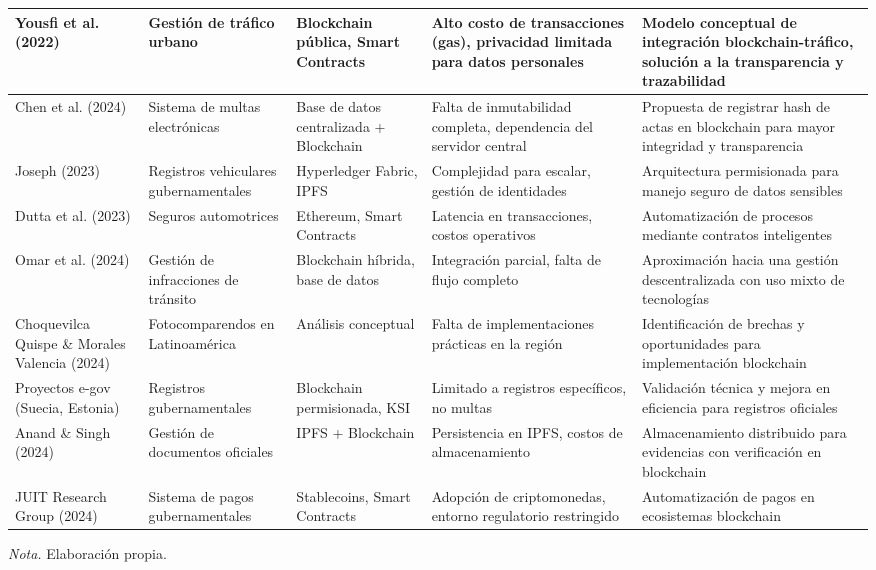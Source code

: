 \begin{longtable}{p{2.5cm} p{2.2cm} p{2.2cm} p{2.5cm} p{3.2cm}}
        \bottomrule
        \endlastfoot
        Yousfi et al. (2022) & Gestión de tráfico urbano & Blockchain pública, Smart Contracts & Alto costo de transacciones (gas), privacidad limitada para datos personales & Modelo conceptual de integración blockchain-tráfico, solución a la transparencia y trazabilidad \\
        \midrule
        Chen et al. (2024) & Sistema de multas electrónicas & Base de datos centralizada + Blockchain & Falta de inmutabilidad completa, dependencia del servidor central & Propuesta de registrar hash de actas en blockchain para mayor integridad y transparencia \\
        \midrule
        Joseph (2023) & Registros vehiculares gubernamentales & Hyperledger Fabric, IPFS & Complejidad para escalar, gestión de identidades & Arquitectura permisionada para manejo seguro de datos sensibles \\
        \midrule
        Dutta et al. (2023) & Seguros automotrices & Ethereum, Smart Contracts & Latencia en transacciones, costos operativos & Automatización de procesos mediante contratos inteligentes \\
        \midrule
        Omar et al. (2024) & Gestión de infracciones de tránsito & Blockchain híbrida, base de datos & Integración parcial, falta de flujo completo & Aproximación hacia una gestión descentralizada con uso mixto de tecnologías \\
        \midrule
        Choquevilca Quispe \& Morales Valencia (2024) & Fotocomparendos en Latinoamérica & Análisis conceptual & Falta de implementaciones prácticas en la región & Identificación de brechas y oportunidades para implementación blockchain \\
        \midrule
        Proyectos e-gov (Suecia, Estonia) & Registros gubernamentales & Blockchain permisionada, KSI & Limitado a registros específicos, no multas & Validación técnica y mejora en eficiencia para registros oficiales \\
        \midrule
        Anand \& Singh (2024) & Gestión de documentos oficiales & IPFS + Blockchain & Persistencia en IPFS, costos de almacenamiento & Almacenamiento distribuido para evidencias con verificación en blockchain \\
        \midrule
        JUIT Research Group (2024) & Sistema de pagos gubernamentales & Stablecoins, Smart Contracts & Adopción de criptomonedas, entorno regulatorio restringido & Automatización de pagos en ecosistemas blockchain \\
    \end{longtable}
    \vspace{1em}
    \begin{flushleft}
        \textit{Nota.} Elaboración propia.
    \end{flushleft}
    \label{tab:estado_arte_comparativo}


